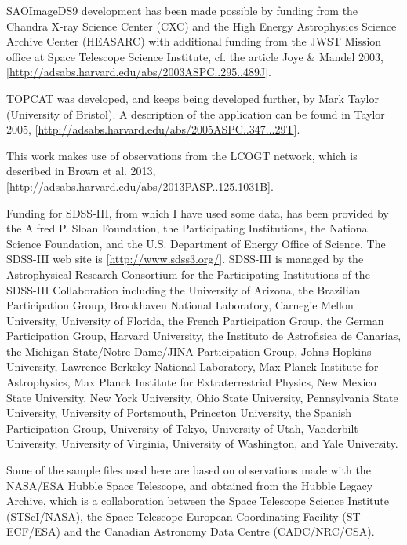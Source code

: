 \documentclass[twocolumn,apj]{openjournal}
\begin{document}
SAOImageDS9 development has been made possible by funding from the Chandra X-ray Science Center (CXC) and the High Energy Astrophysics Science Archive Center (HEASARC) with additional funding from the JWST Mission office at Space Telescope Science Institute, cf. the article Joye \& Mandel 2003, [\href{http://adsabs.harvard.edu/abs/2003ASPC..295..489J}{http://adsabs.harvard.edu/abs/2003ASPC..295..489J}].

TOPCAT was developed, and keeps being developed further, by Mark Taylor (University of Bristol). A description of the application can be found in Taylor 2005, [\href{http://adsabs.harvard.edu/abs/2005ASPC..347...29T}{http://adsabs.harvard.edu/abs/2005ASPC..347...29T}].

This work makes use of observations from the LCOGT network, which is described in 
Brown et al. 2013, [\href{http://adsabs.harvard.edu/abs/2013PASP..125.1031B}{http://adsabs.harvard.edu/abs/2013PASP..125.1031B}].

Funding for SDSS-III, from which I have used some data, has been provided by the Alfred P. Sloan Foundation, the Participating Institutions, the National Science Foundation, and the U.S. Department of Energy Office of Science. The SDSS-III web site is [\href{http://www.sdss3.org/}{http://www.sdss3.org/}]. SDSS-III is managed by the Astrophysical Research Consortium for the Participating Institutions of the SDSS-III Collaboration including the University of Arizona, the Brazilian Participation Group, Brookhaven National Laboratory, Carnegie Mellon University, University of Florida, the French Participation Group, the German Participation Group, Harvard University, the Instituto de Astrofisica de Canarias, the Michigan State/Notre Dame/JINA Participation Group, Johns Hopkins University, Lawrence Berkeley National Laboratory, Max Planck Institute for Astrophysics, Max Planck Institute for Extraterrestrial Physics, New Mexico State University, New York University, Ohio State University, Pennsylvania State University, University of Portsmouth, Princeton University, the Spanish Participation Group, University of Tokyo, University of Utah, Vanderbilt University, University of Virginia, University of Washington, and Yale University. 

Some of the sample files used here are based on observations made with the NASA/ESA Hubble Space Telescope, and obtained from the Hubble Legacy Archive, which is a collaboration between the Space Telescope Science Institute (STScI/NASA), the Space Telescope European Coordinating Facility (ST-ECF/ESA) and the Canadian Astronomy Data Centre (CADC/NRC/CSA).
\end{document}
